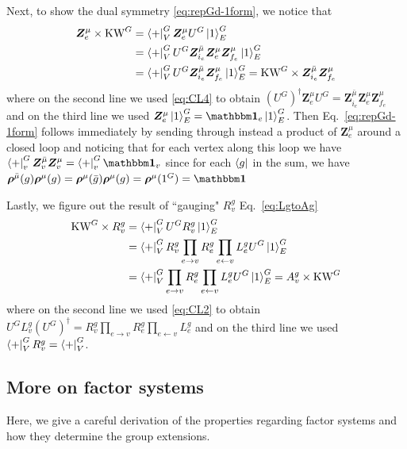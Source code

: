 \documentclass[nofootinbib,prx,twocolumn,showpacs,superscriptaddress,notitlepage,amsmath,amssymb]{revtex4-2}
\theoremstyle{definition}
\def\KW{\text{KW}}
\def\bra#1{\mathinner{\langle{#1}|}}
\def\ket#1{\mathinner{|{#1}\rangle}}
\def\bs#1{\boldsymbol{#1}}
\begin{document}
Next, to show the dual symmetry \eqref{eq:repGd-1form}, we notice that
\begin{align}
\begin{split}
\bs Z^\mu_e  \times  \KW^G &= \bra{+}^G_V \bs Z^\mu_e  U^G  \ket{1}^G_E \\
 &= \bra{+}^G_V   U^G  \bs Z^{\bar\mu}_{i_e}\bs Z^\mu_e \bs Z^{\mu}_{f_e} \ket{1}^G_E \\
&=\bra{+}^G_V   U^G  \bs Z^{\bar\mu}_{i_e}\bs Z^{\mu}_{f_e}  \ket{1}^G_E = \KW^G  \times   \bs Z^{\bar\mu}_{i_e}\bs Z^{\mu}_{f_e}
\label{eq:ZZmapG}
\end{split}
\end{align}
where on the second line we used \eqref{eq:CL4} to obtain $\displaystyle \left(U^G\right)^\dagger\bs  Z^\mu_e U^G = \bs Z^{\bar\mu}_{i_e} \bs  Z^\mu_e\bs Z^{\mu}_{f_e}$
and on the third line we used $ \bs Z^\mu_e\ket{1}^G_E= \bs {\mathbbm 1}_e\ket{1}^G_E$.  Then Eq.~\eqref{eq:repGd-1form} follows immediately by sending through instead a product of $\bs Z^\mu_e$ around a closed loop and noticing that for each vertex along this loop we have $\bra{+}^G_v \displaystyle \bs Z^{\bar \mu}_v \bs Z^\mu_v  = \bra{+}^G_v \bs{\mathbbm 1}_v$ since for each $\bra{g}$ in the sum, we have $\bs\rho^{\bar \mu}(g) \bs\rho^{\mu}(g) = \bs\rho^{ \mu}(\bar g) \bs\rho^{\mu}(g) = \bs\rho^\mu(1^G) = \bs{\mathbbm 1}$



Lastly, we figure out the result of ``gauging" $R^g_v$ Eq.~\eqref{eq:LgtoAg}
\begin{align}
\begin{split}
\KW^G  \times  R^g_v &=\bra{+}^G_V U^G R^g_v \ket{1}^G_E\\
&= \bra{+}^G_V  R^g_v \prod_{e\rightarrow v} R^g_e\prod_{e\leftarrow v} L^g_e U^G  \ket{1}^G_E\\
&= \bra{+}^G_V  \prod_{e\rightarrow v} R^g_e\prod_{e\leftarrow v}  L^g_e U^G  \ket{1}^G_E = A^g_v  \times  \KW^G 
\end{split}
\end{align}
where on the second line we used \eqref{eq:CL2} to obtain $
   \displaystyle U^GL^g_v\left(U^G\right)^\dagger = R^g_v \prod_{e\rightarrow v} R^g_e\prod_{e\leftarrow v} L^g_e$
and on the third line we used $\bra{+}^G_V R^g_v = \bra{+}^G_V$.









\subsection{More on factor systems}\label{app:factor}
Here, we give a careful derivation of the properties regarding factor systems and how they determine the group extensions. 
\end{document}
